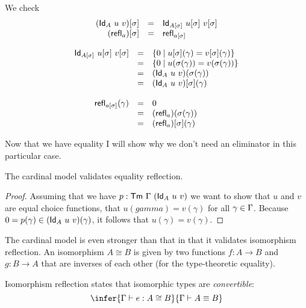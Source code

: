 We check
\[
  \begin{array}{rcl}
    (\mathsf{Id}_A\ u\ v)[\sigma] &=& \mathsf{Id}_{A[\sigma]}\ u[\sigma]\ v[\sigma] \\
    (\mathsf{refl}_a)[\sigma] &=& \mathsf{refl}_{a[\sigma]}
  \end{array}
\]

\[
  \begin{array}{rcl}
    \mathsf{Id}_{A[\sigma]}\ u[\sigma]\ v[\sigma]
    &=& \{ 0 \mid u[\sigma](\gamma) = v[\sigma](\gamma) \} \\
    &=& \{ 0 \mid u(\sigma(\gamma)) = v(\sigma(\gamma)) \} \\
    &=& (\mathsf{Id}_A\ u\ v)(\sigma(\gamma)) \\
    &=& (\mathsf{Id}_A\ u\ v)[\sigma](\gamma) \\
    \\
    \mathsf{refl}_{a[\sigma]}(\gamma)
    &=& 0 \\
    &=& (\mathsf{refl}_a)(\sigma(\gamma)) \\
    &=& (\mathsf{refl}_a)[\sigma](\gamma)
  \end{array}
\]

Now that we have equality I will show why we don't need an eliminator in this
particular case.

\begin{theorem}
  The cardinal model validates equality reflection.
\end{theorem}
%
%
\begin{proof}
  Assuming that we have \(p : \mathsf{Tm}\ \Gamma\ (\mathsf{Id}_A\ u\ v)\) we want to show that
  \(u\) and \(v\) are equal choice functions, \ie that \(u(gamma) = v(\gamma)\)
  for all \(\gamma \in \Gamma\).
  Because \(0 = p(\gamma) \in (\mathsf{Id}_A\ u\ v)(\gamma)\), it follows that
  \(u(\gamma) = v(\gamma)\).
\end{proof}

The cardinal model is even stronger than that in that it validates isomorphism
reflection.
An isomorphism \(A \cong B\) is given by two functions \(f : A \to B\)
and \(g : B \to A\) that are inverses of each other (for the type-theoretic
equality).

\begin{definition}
  Isomorphism reflection states that isomorphic types are \emph{convertible}:
  \[
    \infer
      {\Ga \vdash e : A \cong B}
      {\Ga \vdash A \equiv B}
  \]
\end{definition}

